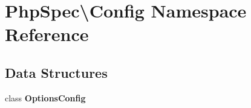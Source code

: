 \section{Php\+Spec\textbackslash{}Config Namespace Reference}
\label{namespace_php_spec_1_1_config}
\subsection*{Data Structures}
\begin{DoxyCompactItemize}
\item 
class {\bf Options\+Config}
\end{DoxyCompactItemize}
